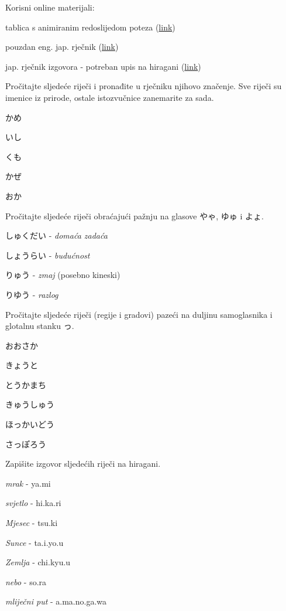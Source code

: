 
\author{autor}

	
	Korisni online materijali:
	\begin{hyou}
		\item tablica s animiranim redoslijedom poteza (\href{https://yosida.com/en/hiragana.html}{link})
		\item pouzdan eng. jap. rječnik (\href{https://jisho.org/}{link})
		\item jap. rječnik izgovora - potreban upis na hiragani (\href{http://www.gavo.t.u-tokyo.ac.jp/ojad/search}{link})
	\end{hyou}
	
	\begin{mondai}{Pročitajte sljedeće riječi i pronađite u rječniku njihovo značenje. Sve riječi su imenice iz prirode, ostale istozvučnice zanemarite za sada.}
		\item かめ
		\item いし
		\item くも
		\item かぜ
		\item おか
	\end{mondai}

	\begin{mondai}{Pročitajte sljedeće riječi obraćajući pažnju na glasove やゃ, ゆゅ i よょ.}
		\item しゅくだい - \textit{domaća zadaća}
		\item しょうらい - \textit{budućnost}
		\item りゅう - \textit{zmaj} (posebno kineski)
		\item りゆう - \textit{razlog}
	\end{mondai}

	\begin{mondai}{Pročitajte sljedeće riječi (regije i gradovi) pazeći na duljinu samoglasnika i glotalnu stanku っ.}
		\item おおさか
		\item きょうと
		\item とうかまち
		\item きゅうしゅう
		\item ほっかいどう
		\item さっぽろう
	\end{mondai}

	\begin{mondai}{Zapišite izgovor sljedećih riječi na hiragani.}
		\item \textit{mrak} - ya.mi
		\item \textit{svjetlo} - hi.ka.ri
		\item \textit{Mjesec} - tsu.ki
		\item \textit{Sunce} - ta.i.yo.u
		\item \textit{Zemlja} - chi.kyu.u
		\item \textit{nebo} - so.ra
		\item \textit{mliječni put} - a.ma.no.ga.wa
	\end{mondai}
